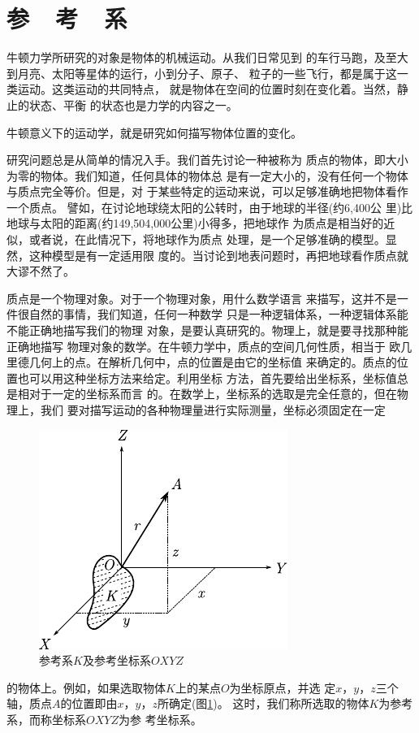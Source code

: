\section[参考系]{参~~考~~系}\label{sec:01.04}

牛顿力学所研究的对象是物体的机械运动。从我们日常见到
的车行马跑，及至大到月亮、太阳等星体的运行，小到分子、原子、
粒子的一些飞行，都是属于这一类运动。这类运动的共同特点，
就是物体在空间的位置时刻在变化着。当然，静止的状态、平衡
的状态也是力学的内容之一。

牛顿意义下的运动学，就是研究如何描写物体位置的变化。

\renewcommand{\hsp}{\hspace{0.1em}}
研究问题总是从简单的情况入手。我们首先讨论一种被称为
质点的物体，即大小为零的物体。我们知道，任何具体的物体总
是有一定大小的，没有任何一个物体与质点完全等价。但是，对
于某些特定的运动来说，可以足够准确地把物体看作一个质点。
譬如，在讨论地球绕太阳的公转时，由于地球的半径\hsp(约\hsp 6,400\hsp 公
里)\hsp 比地球与太阳的距离\hsp (约\hsp 149,504,000\hsp 公里)\hsp 小得多，把地球作
为质点是相当好的近似，或者说，在此情况下，将地球作为质点
处理，是一个足够准确的模型。显然，这种模型是有一定适用限
度的。当讨论到地表问题时，再把地球看作质点就大谬不然了。

质点是一个物理对象。对于一个物理对象，用什么数学语言
来描写，这并不是一件很自然的事情，我们知道，任何一种数学
只是一种逻辑体系，一种逻辑体系能不能正确地描写我们的物理
对象，是要认真研究的。物理上，就是要寻找那种能正确地描写
物理对象的数学。在牛顿力学中，质点的空间几何性质，相当于
欧几里德几何上的点。在解析几何中，点的位置是由它的坐标值
来确定的。质点的位置也可以用这种坐标方法来给定。利用坐标
方法，首先要给出坐标系，坐标值总是相对于一定的坐标系而言
的。在数学上，坐标系的选取是完全任意的，但在物理上，我们
要对描写运动的各种物理量进行实际测量，坐标必须固定在一定
\begin{figure}
    \includegraphics{figure/fig01.04}
    \caption{参考系$K$及参考坐标系$OXYZ$}
    \label{fig:01.04}
\end{figure}
的物体上。例如，如果选取物体$K$上的某点$O$为坐标原点，并选
定$x$，$y$，$z$三个轴，质点$A$的位置即由$x$，$y$，$z$所确定(图\ref{fig:01.04})。
这时，我们称所选取的物体$K$为参考系，而称坐标系$OXYZ$为参
考坐标系。

